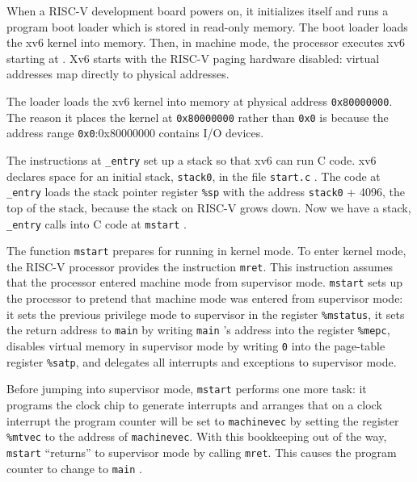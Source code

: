 When a RISC-V development board powers on, it initializes
itself and runs a program boot loader which is stored in read-only
memory.  The boot loader loads the xv6 kernel into memory.  Then, in
machine mode, the processor executes xv6 starting at
.
Xv6 starts with the RISC-V paging hardware disabled:
virtual addresses map directly to physical addresses.

The loader loads the xv6 kernel into memory at physical address
\texttt{0x80000000}.
The reason it places the kernel at
\texttt{0x80000000}
rather than
\texttt{0x0}
is because the address range
\texttt{0x0}:0x80000000
contains I/O devices.

The instructions at
\lstinline{_entry}
set up a stack so that xv6 can run C code.
xv6 declares space for an initial stack,
\lstinline{stack0},
in the file
\lstinline{start.c}
.
The code at
\lstinline{_entry}
loads the stack pointer register
\texttt{\%sp}
with the address
\lstinline{stack0}
+ 4096, the top of the stack, because the stack
on RISC-V grows down.
Now we have a stack,
\lstinline{_entry}
calls into C code at
\lstinline{mstart}
.

The function
\lstinline{mstart}
prepares for running in kernel mode.
To enter kernel mode, the RISC-V processor
provides the instruction
\lstinline{mret}.
This instruction assumes that the processor
entered machine mode from supervisor mode.
\lstinline{mstart}
sets up the processor to pretend
that machine mode was entered
from supervisor mode:
it sets the previous privilege mode to
supervisor in the register
\texttt{\%mstatus},
it sets the return address to
\lstinline{main}
by writing
\lstinline{main} 's
address into
the register
\texttt{\%mepc},
disables virtual memory in supervisor mode
by writing
\lstinline{0}
into the page-table register
\texttt{\%satp},
and delegates all interrupts and exceptions
to supervisor mode.

Before jumping into supervisor mode,
\lstinline{mstart}
performs one more task: it programs the clock
chip to generate interrupts and arranges
that on a clock interrupt the program
counter will be set to
\lstinline{machinevec}
by setting the register
\texttt{\%mtvec}
to the address of
\lstinline{machinevec}.
With this bookkeeping out of the way,
\lstinline{mstart}
``returns'' to supervisor
mode by calling
\lstinline{mret}.
This causes the program counter to change
to
\lstinline{main}
.

